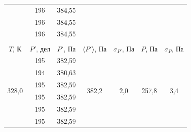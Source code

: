 \documentclass[a4paper, 12pt]{article}
\begin{document}
\begin{table}[H]
\begin{tabular}{ccccccc}
                \multicolumn{1}{|c|}{} & \multicolumn{1}{c|}{196} & \multicolumn{1}{c|}{384,55} & \multicolumn{1}{c|}{} & \multicolumn{1}{c|}{} & \multicolumn{1}{c|}{} & \multicolumn{1}{c|}{} \\ \cline{2-3}
                \multicolumn{1}{|c|}{} & \multicolumn{1}{c|}{196} & \multicolumn{1}{c|}{384,55} & \multicolumn{1}{c|}{} & \multicolumn{1}{c|}{} & \multicolumn{1}{c|}{} & \multicolumn{1}{c|}{} \\ \cline{2-3}
                \multicolumn{1}{|c|}{} & \multicolumn{1}{c|}{196} & \multicolumn{1}{c|}{384,55} & \multicolumn{1}{c|}{} & \multicolumn{1}{c|}{} & \multicolumn{1}{c|}{} & \multicolumn{1}{c|}{} \\ \hline
    		&
    		&
    		&
    		&
    		&
    		&
    		\\ \hline
    		\multicolumn{1}{|c|}{$ T $, К} &
    		\multicolumn{1}{c|}{$ P' $, дел} &
    		\multicolumn{1}{c|}{$ P' $, Па} &
    		\multicolumn{1}{c|}{$ \langle P' \rangle $, Па} &
    		\multicolumn{1}{c|}{$ \sigma_{P'} $, Па} &
    		\multicolumn{1}{c|}{$ P $, Па} &
    		\multicolumn{1}{c|}{$ \sigma_P $, Па} \\ \hline
                \multicolumn{1}{|c|}{\multirow{10}{*}{328,0}} & \multicolumn{1}{c|}{195} & \multicolumn{1}{c|}{382,59} & \multicolumn{1}{c|}{\multirow{10}{*}{382,2}} & \multicolumn{1}{c|}{\multirow{10}{*}{2,0}} & \multicolumn{1}{c|}{\multirow{10}{*}{257,8}} & \multicolumn{1}{c|}{\multirow{10}{*}{3,4}} \\ \cline{2-3}
                \multicolumn{1}{|c|}{} & \multicolumn{1}{c|}{194} & \multicolumn{1}{c|}{380,63} & \multicolumn{1}{c|}{} & \multicolumn{1}{c|}{} & \multicolumn{1}{c|}{} & \multicolumn{1}{c|}{} \\ \cline{2-3}
                \multicolumn{1}{|c|}{} & \multicolumn{1}{c|}{195} & \multicolumn{1}{c|}{382,59} & \multicolumn{1}{c|}{} & \multicolumn{1}{c|}{} & \multicolumn{1}{c|}{} & \multicolumn{1}{c|}{} \\ \cline{2-3}
                \multicolumn{1}{|c|}{} & \multicolumn{1}{c|}{195} & \multicolumn{1}{c|}{382,59} & \multicolumn{1}{c|}{} & \multicolumn{1}{c|}{} & \multicolumn{1}{c|}{} & \multicolumn{1}{c|}{} \\ \cline{2-3}
                \multicolumn{1}{|c|}{} & \multicolumn{1}{c|}{195} & \multicolumn{1}{c|}{382,59} & \multicolumn{1}{c|}{} & \multicolumn{1}{c|}{} & \multicolumn{1}{c|}{} & \multicolumn{1}{c|}{} \\ \cline{2-3}
                \multicolumn{1}{|c|}{} & \multicolumn{1}{c|}{195} & \multicolumn{1}{c|}{382,59} & \multicolumn{1}{c|}{} & \multicolumn{1}{c|}{} & \multicolumn{1}{c|}{} & \multicolumn{1}{c|}{} \\ \cline{2-3}

\end{tabular}
\end{table}
\end{document}

